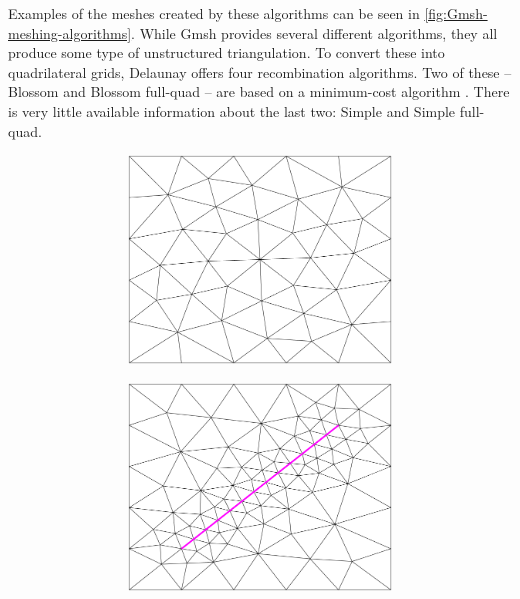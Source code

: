 Examples of the meshes created by these algorithms can be seen in \autoref{fig:Gmsh-meshing-algorithms}. While Gmsh provides several different algorithms, they all produce some type of unstructured triangulation. To convert these into quadrilateral grids, Delaunay offers four recombination algorithms. Two of these -- Blossom and Blossom full-quad -- are based on a minimum-cost algorithm \cite{Gmsh_article}. There is very little available information about the last two: Simple and Simple full-quad.

\begin{figure}[p]
    \centering
    \begin{subfigure}[b]{\textwidth}
        \centering
        \begin{subfigure}[b]{0.32\textwidth}
            \centering
            \includegraphics[width=\textwidth]{report/Images/Software/Gmsh meshing algorithms/gmsh_meshing_algorithms_meshadapt.png}
        \end{subfigure}
        \begin{subfigure}[b]{0.32\textwidth}
            \centering
            \includegraphics[width=\textwidth]{report/Images/Software/Gmsh meshing algorithms/gmsh_meshing_algorithms_embedded_meshadapt.png}

\end{subfigure}
\end{subfigure}
\end{figure}
